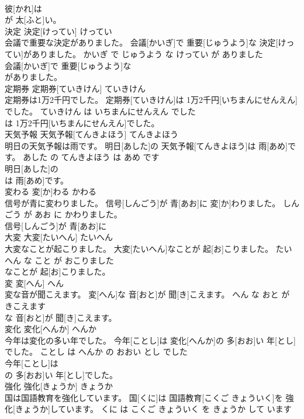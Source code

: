 \documentclass[8pt]{extreport}
\begin{document}
\begin{CJK}{UTF8}{min}
\\	彼[かれ]は
\\	が 太[ふと]い。			
\\	決定	決定[けってい]	けってい	
\\	会議で重要な決定がありました。	会議[かいぎ]で 重要[じゅうよう]な 決定[けってい]がありました。	かいぎ で じゅうよう な けってい が ありました	
\\	会議[かいぎ]で 重要[じゅうよう]な
\\	がありました。			
\\	定期券	定期券[ていきけん]	ていきけん	
\\	定期券は1万2千円でした。	定期券[ていきけん]は 1万2千円[いちまんにせんえん]でした。	ていきけん は いちまんにせんえん でした	
\\	は 1万2千円[いちまんにせんえん]でした。			
\\	天気予報	天気予報[てんきよほう]	てんきよほう	
\\	明日の天気予報は雨です。	明日[あした]の 天気予報[てんきよほう]は 雨[あめ]です。	あした の てんきよほう は あめ です	
\\	明日[あした]の
\\	は 雨[あめ]です。			
\\	変わる	変[か]わる	かわる	
\\	信号が青に変わりました。	信号[しんごう]が 青[あお]に 変[か]わりました。	しんごう が あお に かわりました。	
\\	信号[しんごう]が 青[あお]に
\\	大変	大変[たいへん]	たいへん	
\\	大変なことが起こりました。	大変[たいへん]なことが 起[お]こりました。	たいへん な こと が おこりました	
\\	なことが 起[お]こりました。			
\\	変	変[へん]	へん	
\\	変な音が聞こえます。	変[へん]な 音[おと]が 聞[き]こえます。	へん な おと が きこえます	
\\	な 音[おと]が 聞[き]こえます。			
\\	変化	変化[へんか]	へんか	
\\	今年は変化の多い年でした。	今年[ことし]は 変化[へんか]の 多[おお]い 年[とし]でした。	ことし は へんか の おおい とし でした	
\\	今年[ことし]は
\\	の 多[おお]い 年[とし]でした。			
\\	強化	強化[きょうか]	きょうか	
\\	国は国語教育を強化しています。	国[くに]は 国語教育[こくご きょういく]を 強化[きょうか]しています。	くに は こくご きょういく を きょうか して います	

\end{CJK}
\end{document}

